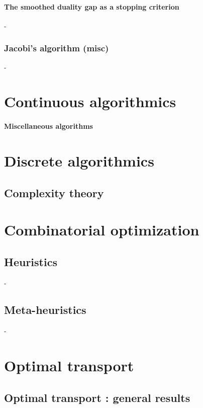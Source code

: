 \documentclass[12pt,openany,oneside]{book}
\theoremstyle{definition}
\numberwithin{definition}{section}
\numberwithin{theorem}{section}
\numberwithin{corollary}{section}
\numberwithin{proposition}{section}
\numberwithin{notation}{section}
\numberwithin{remark}{section}
\numberwithin{hypothesis}{section}
\numberwithin{example}{section}
\begin{document}
\subsection{The smoothed duality gap as a stopping criterion}-
\section{Jacobi's algorithm (misc)}-

\part{Continuous algorithmics}
\subsection{Miscellaneous algorithms}

\part{Discrete algorithmics}

\chapter{Complexity theory}



\part{Combinatorial optimization}

\chapter{Heuristics}\label{chap:heuristics}-
\chapter{Meta-heuristics}\label{chap:meta-heuristics}-

\part{Optimal transport}

\chapter{Optimal transport : general  results}
\end{document}
